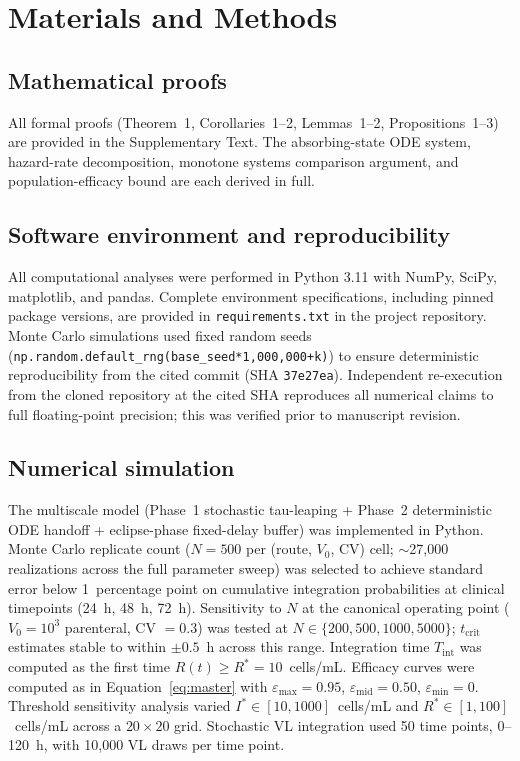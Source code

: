 \documentclass[11pt]{article}
\theoremstyle{definition}
\theoremstyle{remark}
\newcommand{\Tint}{T_{\text{int}}}
\newcommand{\tcrit}{t_{\text{crit}}}
\newcommand{\emax}{\varepsilon_{\max}}
\newcommand{\emid}{\varepsilon_{\text{mid}}}
\newcommand{\emin}{\varepsilon_{\min}}
\begin{document}
\section*{Materials and Methods}

\subsection*{Mathematical proofs}
All formal proofs (Theorem~1, Corollaries~1--2, Lemmas~1--2, Propositions~1--3) are provided in the Supplementary Text. The absorbing-state ODE system, hazard-rate decomposition, monotone systems comparison argument, and population-efficacy bound are each derived in full.

\subsection*{Software environment and reproducibility}
All computational analyses were performed in Python 3.11 with NumPy, SciPy, matplotlib, and pandas. Complete environment specifications, including pinned package versions, are provided in \texttt{requirements.txt} in the project repository. Monte Carlo simulations used fixed random seeds (\texttt{np.random.default\_rng(base\_seed*1{,}000{,}000+k)}) to ensure deterministic reproducibility from the cited commit (SHA \texttt{37e27ea}). Independent re-execution from the cloned repository at the cited SHA reproduces all numerical claims to full floating-point precision; this was verified prior to manuscript revision.

\subsection*{Numerical simulation}
The multiscale model (Phase~1 stochastic tau-leaping + Phase~2 deterministic ODE handoff + eclipse-phase fixed-delay buffer) was implemented in Python. Monte Carlo replicate count ($N = 500$ per (route, $V_{0}$, CV) cell; $\sim$27{,}000 realizations across the full parameter sweep) was selected to achieve standard error below 1~percentage point on cumulative integration probabilities at clinical timepoints (24~h, 48~h, 72~h). Sensitivity to $N$ at the canonical operating point ($V_{0} = 10^{3}$ parenteral, CV $= 0.3$) was tested at $N \in \{200, 500, 1000, 5000\}$; $\tcrit$ estimates stable to within $\pm 0.5$~h across this range. Integration time $\Tint$ was computed as the first time $R(t) \geq R^{*} = 10$~cells/mL. Efficacy curves were computed as in Equation~\ref{eq:master} with $\emax = 0.95$, $\emid = 0.50$, $\emin = 0$. Threshold sensitivity analysis varied $I^{*} \in [10, 1000]$~cells/mL and $R^{*} \in [1, 100]$~cells/mL across a $20 \times 20$ grid. Stochastic VL integration used 50 time points, 0--120~h, with 10{,}000 VL draws per time point.
\end{document}
